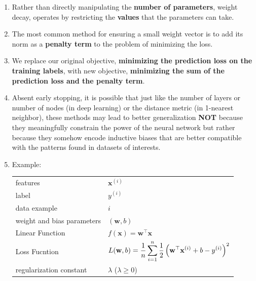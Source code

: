 \begin{enumerate}[itemsep=0.2cm]
    \item Rather than directly manipulating the \textbf{number of parameters}, weight decay, operates by restricting the \textbf{values} that the parameters can take.

    \item The most common method for ensuring a small weight vector is to add its norm as a \textbf{penalty term} to the problem of minimizing the loss.

    \item We replace our original objective, \textbf{minimizing the prediction loss on the training labels}, with new objective, \textbf{minimizing the sum of the prediction loss and the penalty term}.

    \item Absent early stopping, it is possible that just like the number of layers or number of nodes (in deep learning) or the distance metric (in 1-nearest neighbor), these methods may lead to better generalization \textbf{NOT} because they meaningfully constrain the power of the neural network but rather because they somehow encode inductive biases that are better compatible with the patterns found in datasets of interests. 

    \item Example:
    \begin{customTableWrapper}{2}
        \begin{table}[H]
            \centering
            \begin{tabular}{l l}
                features & $\mathbf{x}^{(i)}$ \\

                label & $y^{(i)}$ \\

                data example & $i$ \\

                weight and bias parameters & $(\mathbf{w}, b)$ \\
            
                Linear Function & $f(\mathbf{x}) = \mathbf{w}^\top \mathbf{x}$ \\
    
                Loss Fucntion & $L(\mathbf{w}, b) = \dfrac{1}{n}\displaystyle\sum_{i=1}^n \dfrac{1}{2}\left(\mathbf{w}^\top \mathbf{x}^{(i)} + b - y^{(i)}\right)^2$ \\

                regularization constant & $\lambda$ ($\lambda \geq 0$)\\


\end{tabular}
\end{table}
\end{customTableWrapper}
\end{enumerate}
